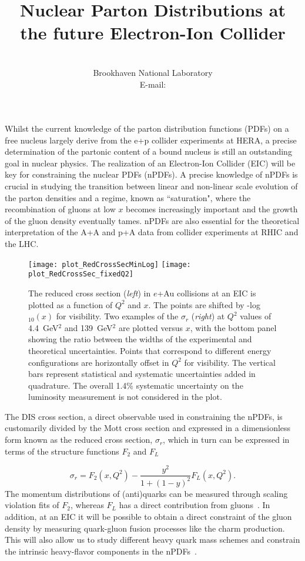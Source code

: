 \documentclass{PoS}
\title{Nuclear Parton Distributions at the future Electron-Ion Collider}
\author{\speaker{Salvatore Fazio} \\
       Brookhaven National Laboratory\\
       E-mail: \email{sfazio@bnl.gov}}
\begin{document}

Whilst the current knowledge of the parton distribution functions (PDFs) on a free nucleus largely derive from the e+p collider experiments at HERA, a precise determination of the partonic content of a bound nucleus is still an outstanding goal in nuclear physics. The realization of an Electron-Ion Collider (EIC) will be key for constraining the nuclear PDFs (nPDFs).  A precise knowledge of nPDFs is crucial in studying the transition between linear and non-linear scale evolution of the parton densities and a regime, known as ``saturation", where the recombination of gluons at low $x$ becomes increasingly important and the growth of the gluon density eventually tames. nPDFs are also essential for the theoretical interpretation of the A+A and p+A data from collider experiments at RHIC and the LHC. 
 
 \begin{figure}[t] 
   \centering
   \texttt{[image: plot\_RedCrossSecMinLog]}   
   \texttt{[image: plot\_RedCrossSec\_fixedQ2]}
   \caption{The reduced cross section ({\it left}) in $e$+Au collisions at an EIC is plotted as a 
function of $Q^2$ and $x$. The points are shifted by -log$_{10}(x)$ for visibility. 
Two examples of the $\sigma_{r}$ ({\it right}) at $Q^{2}$ values of 4.4~GeV$^{2}$ and 139~GeV$^{2}$  are plotted versus $x$, 
with the bottom panel showing the ratio between the widths of the experimental and theoretical uncertainties. Points that correspond to different energy 
configurations are horizontally offset in $Q^2$ for visibility. The vertical bars represent statistical and systematic uncertainties added in quadrature. The overall 1.4\% systematic uncertainty on the luminosity measurement is not considered in the plot.}
   \label{Fig:SigmaRed} 
\end{figure}
 
The DIS cross section, a direct observable used in constraining the nPDFs, is customarily divided by the Mott cross section and expressed in a dimensionless form known as the reduced cross section, $\sigma_{r}$, which in turn can be expressed in terms of the structure functions $F_{2}$ and $F_{L}$ 

\begin{equation}
\sigma_{r} = F_2(x,Q^2) - \frac{y^2}{1 + (1 - y)^2} F_L(x,Q^2).
\label{Eq:SigmaRed}
\end{equation}
The momentum distributions of (anti)quarks can be measured through scaling violation fits of $F_{2}$, whereas $F_{L}$ has a direct contribution from gluons~\cite{Armesto2011}. 
In addition, at an EIC it will be possible to obtain a direct constraint of the gluon density by measuring quark-gluon fusion processes like the charm production. This will also allow us to study different heavy quark mass schemes and constrain the intrinsic heavy-flavor components in the nPDFs~\cite{Accardi:2016ndt}. 
\end{document}
